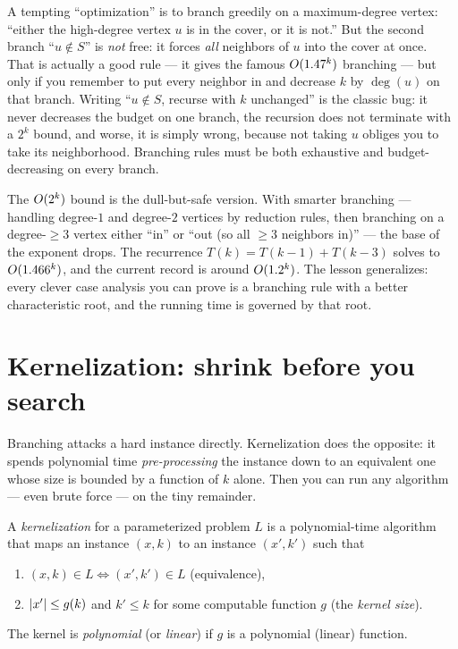 \begin{trapbox}
A tempting ``optimization'' is to branch greedily on a maximum-degree vertex: ``either the high-degree vertex $u$ is in the cover, or it is not.'' But the second branch ``$u\notin S$'' is \emph{not} free: it forces \emph{all} neighbors of $u$ into the cover at once. That is actually a good rule --- it gives the famous $O(1.47^k)$ branching --- but only if you remember to put every neighbor in and decrease $k$ by $\deg(u)$ on that branch. Writing ``$u\notin S$, recurse with $k$ unchanged'' is the classic bug: it never decreases the budget on one branch, the recursion does not terminate with a $2^k$ bound, and worse, it is simply wrong, because not taking $u$ obliges you to take its neighborhood. Branching rules must be both exhaustive and budget-decreasing on every branch.
\end{trapbox}

\begin{aestheticbox}
The $O(2^k)$ bound is the dull-but-safe version. With smarter branching --- handling degree-$1$ and degree-$2$ vertices by reduction rules, then branching on a degree-$\ge 3$ vertex either ``in'' or ``out (so all $\ge 3$ neighbors in)'' --- the base of the exponent drops. The recurrence $T(k)=T(k-1)+T(k-3)$ solves to $O(1.466^k)$, and the current record is around $O(1.2^k)$. The lesson generalizes: every clever case analysis you can prove is a branching rule with a better characteristic root, and the running time is governed by that root.
\end{aestheticbox}

\section{Kernelization: shrink before you search}

Branching attacks a hard instance directly. Kernelization does the opposite: it spends polynomial time \emph{pre-processing} the instance down to an equivalent one whose size is bounded by a function of $k$ alone. Then you can run any algorithm --- even brute force --- on the tiny remainder.

\begin{definition}[Kernel]\label{ch25:def-kernel}
A \emph{kernelization} for a parameterized problem $L$ is a polynomial-time algorithm that maps an instance $(x,k)$ to an instance $(x',k')$ such that
\begin{enumerate}
  \item $(x,k)\in L \iff (x',k')\in L$ (equivalence),
  \item $\lvert x'\rvert\le g(k)$ and $k'\le k$ for some computable function $g$ (the \emph{kernel size}).
\end{enumerate}
The kernel is \emph{polynomial} (or \emph{linear}) if $g$ is a polynomial (linear) function.
\end{definition}

